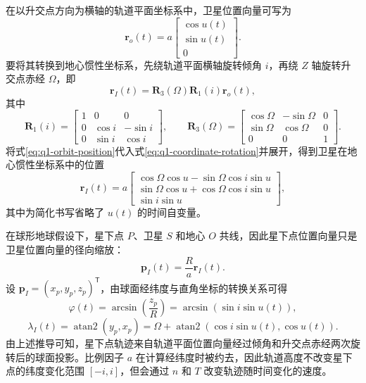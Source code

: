 \documentclass[withoutpreface,bwprint]{cumcmthesis} %
\begin{document}
在以升交点方向为横轴的轨道平面坐标系中，卫星位置向量可写为
\begin{equation}
    \boldsymbol r_o(t)
    =a\begin{bmatrix}\cos u(t)\\ \sin u(t)\\ 0\end{bmatrix}.
    \label{eq:q1-orbit-position}
\end{equation}
要将其转换到地心惯性坐标系，先绕轨道平面横轴旋转倾角 $i$，再绕 $Z$ 轴旋转升交点赤经 $\Omega$，即
\begin{equation}
    \boldsymbol r_I(t)
    =\boldsymbol R_3(\Omega)\boldsymbol R_1(i)\boldsymbol r_o(t),
    \label{eq:q1-coordinate-rotation}
\end{equation}
其中
\begin{equation}
    \boldsymbol R_1(i)=
    \begin{bmatrix}
        1&0&0\\
        0&\cos i&-\sin i\\
        0&\sin i&\cos i
    \end{bmatrix},\qquad
    \boldsymbol R_3(\Omega)=
    \begin{bmatrix}
        \cos\Omega&-\sin\Omega&0\\
        \sin\Omega&\cos\Omega&0\\
        0&0&1
    \end{bmatrix}.
    \label{eq:q1-rotation-matrices}
\end{equation}
将式\eqref{eq:q1-orbit-position}代入式\eqref{eq:q1-coordinate-rotation}并展开，得到卫星在地心惯性坐标系中的位置
\begin{equation}
    \boldsymbol r_I(t)=a
    \begin{bmatrix}
        \cos\Omega\cos u-\sin\Omega\cos i\sin u\\
        \sin\Omega\cos u+\cos\Omega\cos i\sin u\\
        \sin i\sin u
    \end{bmatrix},
    \label{eq:q1-eci-position}
\end{equation}
其中为简化书写省略了 $u(t)$ 的时间自变量。

在球形地球假设下，星下点 $P$、卫星 $S$ 和地心 $O$ 共线，因此星下点位置向量只是卫星位置向量的径向缩放：
\begin{equation}
    \boldsymbol p_I(t)=\frac{R}{a}\boldsymbol r_I(t).
    \label{eq:q1-subsatellite-vector}
\end{equation}
设 $\boldsymbol p_I=(x_p,y_p,z_p)^{\mathsf T}$，由球面经纬度与直角坐标的转换关系可得
\begin{equation}
    \varphi(t)=\arcsin\!\left(\frac{z_p}{R}\right)
    =\arcsin\!\left(\sin i\sin u(t)\right),
    \label{eq:q1-ground-latitude-single}
\end{equation}
\begin{equation}
    \lambda_I(t)=\operatorname{atan2}(y_p,x_p)
    =\Omega+\operatorname{atan2}\!\left(\cos i\sin u(t),\cos u(t)\right).
    \label{eq:q1-inertial-longitude}
\end{equation}
由上述推导可知，星下点轨迹来自轨道平面位置向量经过倾角和升交点赤经两次旋转后的球面投影。比例因子 $a$ 在计算经纬度时被约去，因此轨道高度不改变星下点的纬度变化范围 $[-i,i]$，但会通过 $n$ 和 $T$ 改变轨迹随时间变化的速度。
\end{document}
